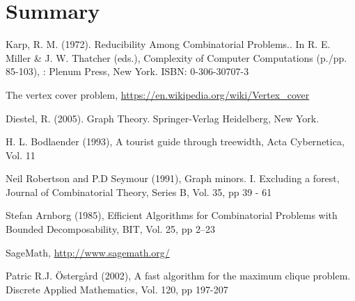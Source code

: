 \documentclass[11pt,a4paper]{article}
\begin{document}
\section{Summary}



\begin{thebibliography}{9}

 Karp, R. M. (1972). Reducibility Among Combinatorial Problems.. In R. E. Miller \& J. W. Thatcher (eds.), Complexity of Computer Computations (p./pp. 85-103), : Plenum Press, New York. ISBN: 0-306-30707-3

 The vertex cover problem, \url{https://en.wikipedia.org/wiki/Vertex_cover}

 Diestel, R. (2005). Graph Theory. Springer-Verlag Heidelberg, New York. 

 H. L. Bodlaender (1993), A tourist guide through treewidth, Acta Cybernetica, Vol. 11

 Neil Robertson and P.D Seymour (1991), Graph minors. I. Excluding a forest, Journal of Combinatorial Theory, Series B, Vol. 35, pp 39 - 61

 Stefan Arnborg (1985), Efficient Algorithms for Combinatorial Problems with Bounded Decomposability, BIT, Vol. 25, pp 2--23

 SageMath, \url{http://www.sagemath.org/}

 Patric R.J. Östergård (2002), A fast algorithm for the maximum clique problem. Discrete Applied Mathematics, Vol. 120, pp 197-207

\end{thebibliography}
\end{document}

